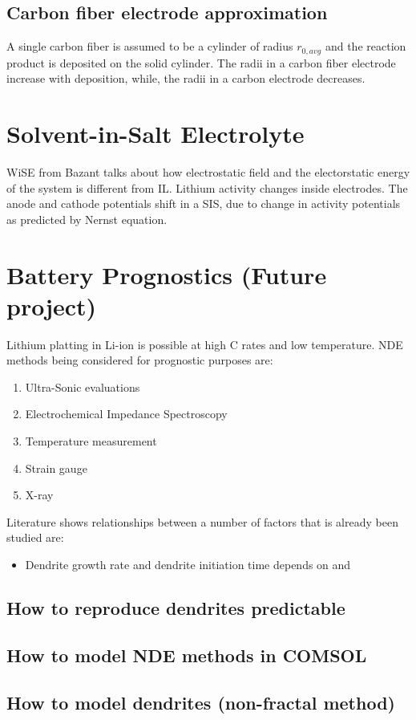 \documentclass[12pt]{book}
\begin{document}
\subsection{Carbon fiber electrode approximation}
A single carbon fiber is assumed to be a cylinder of radius $r_{0,avg}$ and the reaction product is deposited on the solid cylinder. The radii in a carbon fiber electrode increase with deposition, while, the radii in a carbon electrode decreases.
\section{Solvent-in-Salt Electrolyte}
WiSE from Bazant talks about how electrostatic field and the electorstatic energy of the system is different from IL. 
Lithium activity changes inside electrodes. The anode and cathode potentials shift in a SIS, due to change in activity potentials as predicted by Nernst equation.
\section{Battery Prognostics (Future project)}
Lithium platting in Li-ion is possible at high C rates and low temperature. 
NDE methods being considered for prognostic purposes are: 
\begin{enumerate}
\item Ultra-Sonic evaluations
\item Electrochemical Impedance Spectroscopy
\item Temperature measurement
\item Strain gauge
\item X-ray
\end{enumerate}

Literature shows relationships between a number of factors that is already been studied are:
\begin{itemize}
\item Dendrite growth rate and dendrite initiation time depends on   and  
\end{itemize}


\subsection{How to reproduce dendrites predictable}
\subsection{How to model NDE methods in COMSOL}
\subsection{How to model dendrites (non-fractal method)}
\end{document}
